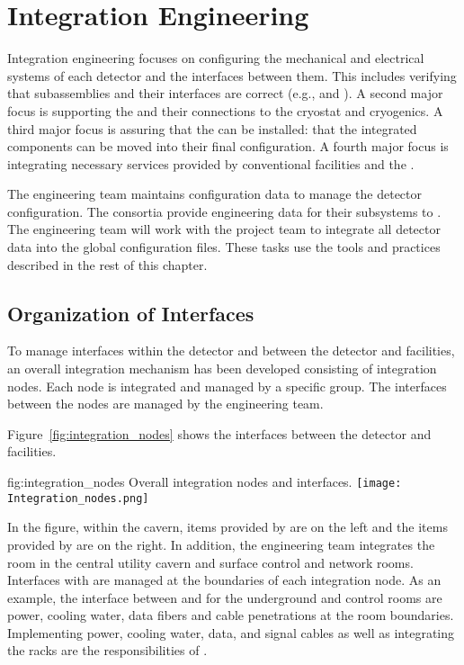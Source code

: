 ﻿\chapter{Integration Engineering}
\label{sec:fdsp-coord-integ-sysengr}


Integration engineering focuses on configuring the
mechanical and electrical systems of each detector and the interfaces
between them. This includes verifying that subassemblies and their
interfaces are correct (e.g.,  and  ). A
second major focus is supporting the  and their
connections to the cryostat and cryogenics. A third major focus is
assuring that the  can be installed: that the
integrated components can be moved into their final configuration. A
fourth major focus is integrating necessary services provided by
conventional facilities and the .


The  engineering team maintains configuration data to manage
the detector configuration. The consortia provide engineering data for
their subsystems to . The  engineering team will
work with the  project team to integrate all detector data
into the global  configuration files.  These tasks use the
tools and practices described in the rest of this chapter.

\section{Organization of Interfaces}
\label{sec:inter-org-interf}
To manage interfaces within the detector and between the
detector and facilities, an overall integration mechanism has been
developed consisting of integration nodes. Each node is integrated
and managed by a specific group. The interfaces between the nodes are
managed by the  engineering team.

Figure~\ref{fig:integration_nodes} shows the interfaces between the
detector and facilities.
\begin{dunefigure}{fig:integration_nodes}
  {Overall integration nodes and interfaces.}
  \texttt{[image: Integration\_nodes.png]}
\end{dunefigure}
In the figure, within the cavern, items provided by  are
on the left and the items provided by  are on the
right. In addition, the  engineering team integrates the
 room in the central utility cavern and surface control and
network rooms. Interfaces with  are managed at the
boundaries of each integration node. As an example, the interface
between  and  for the underground 
and control rooms are power, cooling water, data fibers and cable
penetrations at the room boundaries. Implementing power, cooling
water, data, and signal cables as well as integrating the racks are
the responsibilities of .


